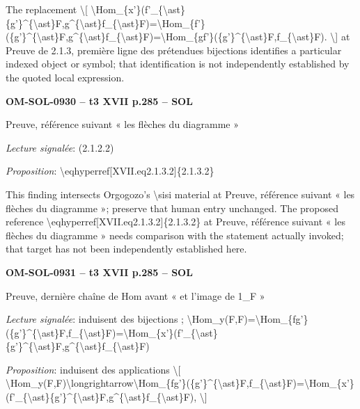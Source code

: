 The replacement \textbackslash{}[ \textbackslash{}Hom\_\{x'\}(f'\_\{\textbackslash{}ast\}\{g'\}\textasciicircum{}\{\textbackslash{}ast\}F,g\textasciicircum{}\{\textbackslash{}ast\}f\_\{\textbackslash{}ast\}F)=\allowbreak \textbackslash{}Hom\_\{f'\}(\{g'\}\textasciicircum{}\{\textbackslash{}ast\}F,g\textasciicircum{}\{\textbackslash{}ast\}f\_\{\textbackslash{}ast\}F)=\allowbreak \textbackslash{}Hom\_\{gf'\}(\{g'\}\textasciicircum{}\{\textbackslash{}ast\}F,f\_\{\textbackslash{}ast\}F). \textbackslash{}] at Preuve de 2.1.3, première ligne des prétendues bijections identifies a particular indexed object or symbol; that identification is not independently established by the quoted local expression.\par
\par\noindent\textbf{OM-SOL-0930 -- t3 XVII p.285 -- SOL}\par
Preuve, référence suivant « les flèches du diagramme »\par
\emph{Lecture signalée}: (2.1.2.2)\par
\emph{Proposition}: \textbackslash{}eqhyperref[XVII.eq2.1.3.2]\{2.1.3.2\}\par
This finding intersects Orgogozo's \textbackslash{}sisi material at Preuve, référence suivant « les flèches du diagramme »; preserve that human entry unchanged. The proposed reference \textbackslash{}eqhyperref[XVII.eq2.1.3.2]\{2.1.3.2\} at Preuve, référence suivant « les flèches du diagramme » needs comparison with the statement actually invoked; that target has not been independently established here.\par
\par\noindent\textbf{OM-SOL-0931 -- t3 XVII p.285 -- SOL}\par
Preuve, dernière chaîne de Hom avant « et l'image de 1\_F »\par
\emph{Lecture signalée}: induisent des bijections ; \textbackslash{}Hom\_y(F,F)=\allowbreak \textbackslash{}Hom\_\{fg'\}(\{g'\}\textasciicircum{}\{\textbackslash{}ast\}F,f\_\{\textbackslash{}ast\}F)=\allowbreak \textbackslash{}Hom\_\{x'\}(f'\_\{\textbackslash{}ast\}\{g'\}\textasciicircum{}\{\textbackslash{}ast\}F,g\textasciicircum{}\{\textbackslash{}ast\}f\_\{\textbackslash{}ast\}F)\par
\emph{Proposition}: induisent des applications \textbackslash{}[ \textbackslash{}Hom\_y(F,F)\textbackslash{}longrightarrow\textbackslash{}Hom\_\{fg'\}(\{g'\}\textasciicircum{}\{\textbackslash{}ast\}F,f\_\{\textbackslash{}ast\}F)=\allowbreak \textbackslash{}Hom\_\{x'\}(f'\_\{\textbackslash{}ast\}\{g'\}\textasciicircum{}\{\textbackslash{}ast\}F,g\textasciicircum{}\{\textbackslash{}ast\}f\_\{\textbackslash{}ast\}F), \textbackslash{}]\par
